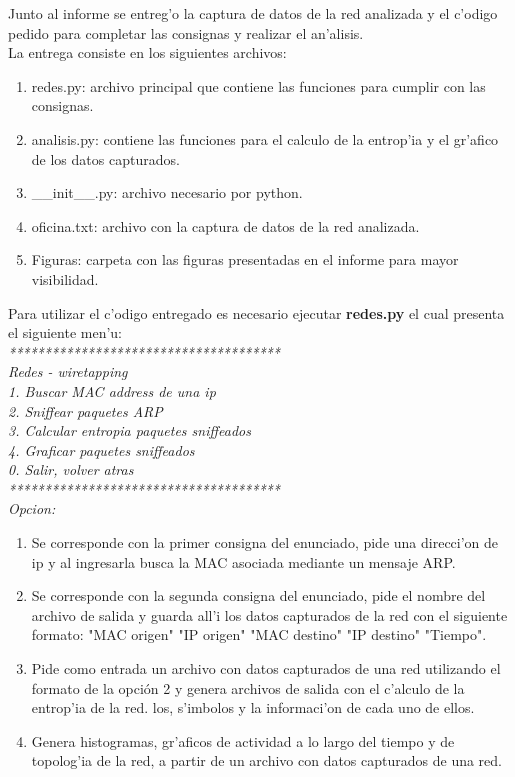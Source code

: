 \documentclass[a4paper,10pt]{article}
\begin{document}
Junto al informe se entreg'o la captura de datos de la red analizada y el c'odigo pedido para completar las consignas y realizar el an'alisis. \\
La entrega consiste en los siguientes archivos:
\noindent \begin{enumerate}
\item	redes.py: archivo principal que contiene las funciones para cumplir con las consignas.
\item	analisis.py: contiene las funciones para el calculo de la entrop'ia y el gr'afico de los datos capturados.
\item	\_\_init\_\_.py: archivo necesario por python.
\item	oficina.txt: archivo con la captura de datos de la red analizada.
\item	Figuras: carpeta con las figuras presentadas en el informe para mayor visibilidad. 
\end{enumerate}
Para utilizar el c'odigo entregado es necesario ejecutar \textbf{redes.py} el cual presenta el siguiente men'u:\\
\textit{
**************************************	\\
Redes - wiretapping	\\
1. Buscar MAC address de una ip	\\
2. Sniffear paquetes ARP	\\
3. Calcular entropia paquetes sniffeados	\\
4. Graficar paquetes sniffeados	\\
0. Salir, volver atras	\\
**************************************	\\
Opcion: 	\\
}
\noindent \begin{enumerate}
\item	Se corresponde con la primer consigna del enunciado, pide una direcci'on de ip y al ingresarla busca la MAC asociada mediante un mensaje ARP.
\item	Se corresponde con la segunda consigna del enunciado, pide el nombre del archivo de salida y guarda all'i los datos capturados de la red con el siguiente formato: "MAC origen" "IP origen" "MAC destino" "IP destino" "Tiempo". 
\item	Pide como entrada un archivo con datos capturados de una red utilizando el formato de la opción 2 y genera archivos de salida con el c'alculo de la entrop'ia de la red. los, s'imbolos y la informaci'on de cada uno de ellos.
\item	Genera histogramas, gr'aficos de actividad a lo largo del tiempo y de topolog'ia de la red, a partir de un archivo con datos capturados de una red.
\end{enumerate}
\end{document}
